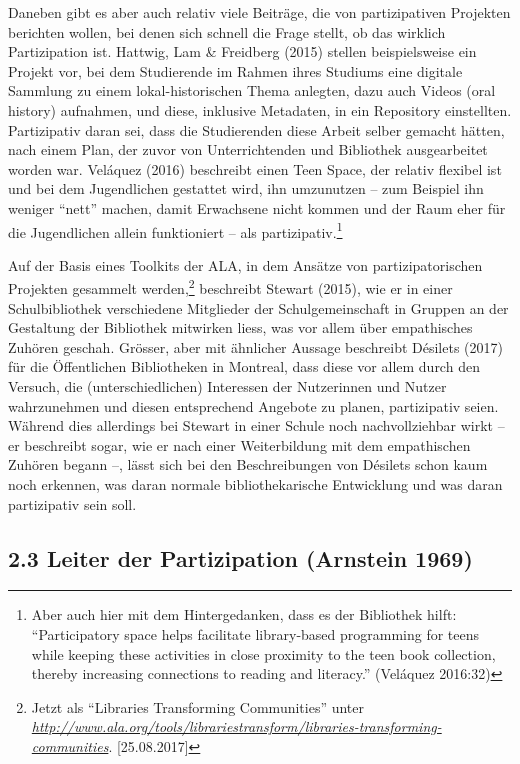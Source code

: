 \documentclass[a4paper,
fontsize=11pt,
oneside,
numbers=noperiodatend,
parskip=half-,
bibliography=totoc,
final
]{scrartcl}
\begin{document}
Daneben gibt es aber auch relativ viele Beiträge, die von partizipativen
Projekten berichten wollen, bei denen sich schnell die Frage stellt, ob
das wirklich Partizipation ist. Hattwig, Lam \& Freidberg (2015) stellen
beispielsweise ein Projekt vor, bei dem Studierende im Rahmen ihres
Studiums eine digitale Sammlung zu einem lokal-historischen Thema
anlegten, dazu auch Videos (oral history) aufnahmen, und diese,
inklusive Metadaten, in ein Repository einstellten. Partizipativ daran
sei, dass die Studierenden diese Arbeit selber gemacht hätten, nach
einem Plan, der zuvor von Unterrichtenden und Bibliothek ausgearbeitet
worden war. Veláquez (2016) beschreibt einen Teen Space, der relativ
flexibel ist und bei dem Jugendlichen gestattet wird, ihn umzunutzen --
zum Beispiel ihn weniger \enquote{nett} machen, damit Erwachsene nicht
kommen und der Raum eher für die Jugendlichen allein funktioniert -- als
partizipativ.\footnote{Aber auch hier mit dem Hintergedanken, dass es
  der Bibliothek hilft: \enquote{Participatory space helps facilitate
  library-based programming for teens while keeping these activities in
  close proximity to the teen book collection, thereby increasing
  connections to reading and literacy.} (Veláquez 2016:32)}

Auf der Basis eines Toolkits der ALA, in dem Ansätze von
partizipatorischen Projekten gesammelt werden,\footnote{Jetzt als
  \enquote{Libraries Transforming Communities} unter
  \href{http://www.ala.org/tools/librariestransform/libraries-transforming-communities}{\emph{http://www.ala.org/tools/librariestransform/libraries-transforming-communities}}.
  {[}25.08.2017{]}} beschreibt Stewart (2015), wie er in einer
Schulbibliothek verschiedene Mitglieder der Schulgemeinschaft in Gruppen
an der Gestaltung der Bibliothek mitwirken liess, was vor allem über
empathisches Zuhören geschah. Grösser, aber mit ähnlicher Aussage
beschreibt Désilets (2017) für die Öffentlichen Bibliotheken in
Montreal, dass diese vor allem durch den Versuch, die
(unterschiedlichen) Interessen der Nutzerinnen und Nutzer wahrzunehmen
und diesen entsprechend Angebote zu planen, partizipativ seien. Während
dies allerdings bei Stewart in einer Schule noch nachvollziehbar wirkt
-- er beschreibt sogar, wie er nach einer Weiterbildung mit dem
empathischen Zuhören begann --, lässt sich bei den Beschreibungen von
Désilets schon kaum noch erkennen, was daran normale bibliothekarische
Entwicklung und was daran partizipativ sein soll.

\subsection{2.3 Leiter der Partizipation (Arnstein
1969)}\label{leiter-der-partizipation-arnstein-1969}
\end{document}

